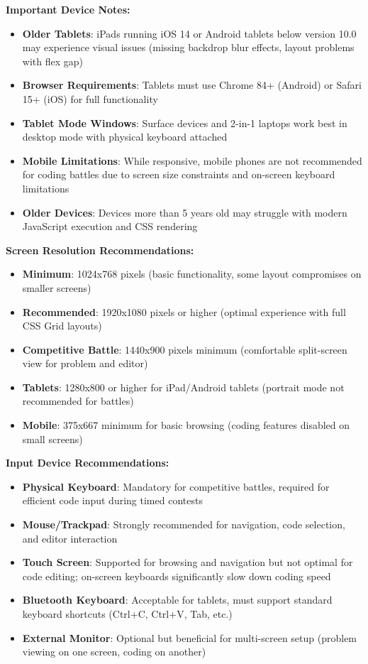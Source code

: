 \documentclass[12pt,a4paper]{article}
\begin{document}
\textbf{Important Device Notes:}
\begin{itemize}[leftmargin=*]
\item \textbf{Older Tablets}: iPads running iOS 14 or Android tablets below version 10.0 may experience visual issues (missing backdrop blur effects, layout problems with flex gap)
\item \textbf{Browser Requirements}: Tablets must use Chrome 84+ (Android) or Safari 15+ (iOS) for full functionality
\item \textbf{Tablet Mode Windows}: Surface devices and 2-in-1 laptops work best in desktop mode with physical keyboard attached
\item \textbf{Mobile Limitations}: While responsive, mobile phones are not recommended for coding battles due to screen size constraints and on-screen keyboard limitations
\item \textbf{Older Devices}: Devices more than 5 years old may struggle with modern JavaScript execution and CSS rendering
\end{itemize}

\textbf{Screen Resolution Recommendations:}
\begin{itemize}[leftmargin=*]
\item \textbf{Minimum}: 1024x768 pixels (basic functionality, some layout compromises on smaller screens)
\item \textbf{Recommended}: 1920x1080 pixels or higher (optimal experience with full CSS Grid layouts)
\item \textbf{Competitive Battle}: 1440x900 pixels minimum (comfortable split-screen view for problem and editor)
\item \textbf{Tablets}: 1280x800 or higher for iPad/Android tablets (portrait mode not recommended for battles)
\item \textbf{Mobile}: 375x667 minimum for basic browsing (coding features disabled on small screens)
\end{itemize}

\textbf{Input Device Recommendations:}
\begin{itemize}[leftmargin=*]
\item \textbf{Physical Keyboard}: Mandatory for competitive battles, required for efficient code input during timed contests
\item \textbf{Mouse/Trackpad}: Strongly recommended for navigation, code selection, and editor interaction
\item \textbf{Touch Screen}: Supported for browsing and navigation but not optimal for code editing; on-screen keyboards significantly slow down coding speed
\item \textbf{Bluetooth Keyboard}: Acceptable for tablets, must support standard keyboard shortcuts (Ctrl+C, Ctrl+V, Tab, etc.)
\item \textbf{External Monitor}: Optional but beneficial for multi-screen setup (problem viewing on one screen, coding on another)
\end{itemize}
\end{document}
